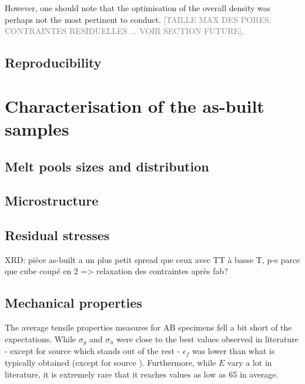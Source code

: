 However, one should note that the optimisation of the overall density was perhaps not the most pertinent to conduct. \textcolor{gray}{[TAILLE MAX DES PORES, CONTRAINTES RESIDUELLES ... VOIR SECTION FUTURE]}.\\ 
\subsection{Reproducibility}


\section{Characterisation of the as-built samples}

\subsection{Melt pools sizes and distribution}

\subsection{Microstructure}

\subsection{Residual stresses}


XRD: pièce as-built a un plus petit spread que ceux avec TT à basse T, p-e parce que cube coupé en 2 => relaxation des contraintes après fab?

\subsection{Mechanical properties}

The average tensile properties measures for AB specimens fell a bit short of the expectations. While $\sigma_y$ and $\sigma_u$ were close to the best values observed in literature - except for source \parencite{EOS} which stands out of the rest -  $\epsilon_f$ was lower than what is typically obtained (except for source \parencite{aboulkhair2017}). Furthermore, while $E$ vary a lot in literature, it is extremely rare that it reaches values as low as 65 in average. \\

